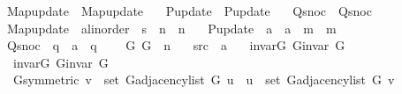 \begin{isabellebody}
\ \ Map{\isacharunderscore}{\kern0pt}update\ {\isacharequal}{\kern0pt}\ Map{\isacharunderscore}{\kern0pt}update\ \isanewline
\ \ P{\isacharunderscore}{\kern0pt}update\ {\isacharequal}{\kern0pt}\ P{\isacharunderscore}{\kern0pt}update\ \isanewline
\ \ Q{\isacharunderscore}{\kern0pt}snoc\ {\isacharequal}{\kern0pt}\ Q{\isacharunderscore}{\kern0pt}snoc\ \isanewline
\ \ Map{\isacharunderscore}{\kern0pt}update\ {\isacharcolon}{\kern0pt}{\isacharcolon}{\kern0pt}\ {\isachardoublequoteopen}{\isacharprime}{\kern0pt}a{\isacharcolon}{\kern0pt}{\isacharcolon}{\kern0pt}linorder\ {\isasymRightarrow}\ {\isacharprime}{\kern0pt}s\ {\isasymRightarrow}\ {\isacharprime}{\kern0pt}n\ {\isasymRightarrow}\ {\isacharprime}{\kern0pt}n{\isachardoublequoteclose}\ \isanewline
\ \ P{\isacharunderscore}{\kern0pt}update\ {\isacharcolon}{\kern0pt}{\isacharcolon}{\kern0pt}\ {\isachardoublequoteopen}{\isacharprime}{\kern0pt}a\ {\isasymRightarrow}\ {\isacharprime}{\kern0pt}a\ {\isasymRightarrow}\ {\isacharprime}{\kern0pt}m\ {\isasymRightarrow}\ {\isacharprime}{\kern0pt}m{\isachardoublequoteclose}\ \isanewline
\ \ Q{\isacharunderscore}{\kern0pt}snoc\ {\isacharcolon}{\kern0pt}{\isacharcolon}{\kern0pt}\ {\isachardoublequoteopen}{\isacharprime}{\kern0pt}q\ {\isasymRightarrow}\ {\isacharprime}{\kern0pt}a\ {\isasymRightarrow}\ {\isacharprime}{\kern0pt}q{\isachardoublequoteclose}\ {\isacharplus}{\kern0pt}\isanewline
\ \ \ G{}\ G{}\ {\isacharcolon}{\kern0pt}{\isacharcolon}{\kern0pt}\ {\isacharprime}{\kern0pt}n\isanewline
\ \ \ src\ {\isacharcolon}{\kern0pt}{\isacharcolon}{\kern0pt}\ {\isacharprime}{\kern0pt}a\isanewline
\ \ \ invar{\isacharunderscore}{\kern0pt}G{}{\isacharcolon}{\kern0pt}\ {\isachardoublequoteopen}G{\isachardot}{\kern0pt}invar\ G{}{\isachardoublequoteclose}\isanewline
\ \ \ invar{\isacharunderscore}{\kern0pt}G{}{\isacharcolon}{\kern0pt}\ {\isachardoublequoteopen}G{\isachardot}{\kern0pt}invar\ G{}{\isachardoublequoteclose}\isanewline
\ \ \ G{}{\isacharunderscore}{\kern0pt}symmetric{\isacharcolon}{\kern0pt}\ {\isachardoublequoteopen}v\ {\isasymin}\ set\ {\isacharparenleft}{\kern0pt}G{\isachardot}{\kern0pt}adjacency{\isacharunderscore}{\kern0pt}list\ G{}\ u{\isacharparenright}{\kern0pt}\ {\isasymlongleftrightarrow}\ u\ {\isasymin}\ set\ {\isacharparenleft}{\kern0pt}G{\isachardot}{\kern0pt}adjacency{\isacharunderscore}{\kern0pt}list\ G{}\ v{\isacharparenright}{\kern0pt}{\isachardoublequoteclose}\isanewline

\end{isabellebody}
